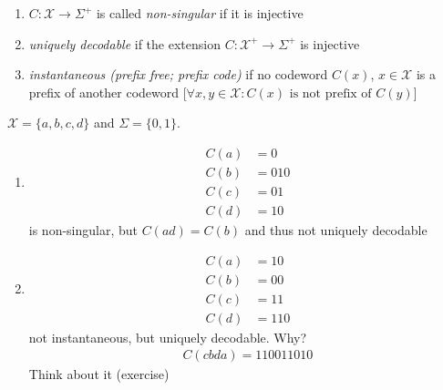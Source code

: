\documentclass[mfit.tex]{subfiles}
\begin{document}
\begin{defi*}
  \begin{enumerate}
    \item $C: \mathcal{X} \to \Sigma^+$ is called \emph{non-singular} if it is injective
    \item \emph{uniquely decodable} if the extension $C: \mathcal{X}^+ \to \Sigma^+$ is injective
    \item \emph{instantaneous (prefix free; prefix code)} if no codeword $C(x)$, $x \in \mathcal{X}$ is a prefix of another codeword [$\forall x,y \in \mathcal{X}: C(x) \text{ is not prefix of } C(y)$]
  \end{enumerate}
\end{defi*}

\begin{ex}
  $\mathcal{X} = \{a,b,c,d\}$ and $\Sigma = \{0,1\}$.
  \begin{enumerate}
    \item \begin{align*}
      C(a) &= 0 \\
      C(b) &= 010 \\
      C(c) &= 01 \\
      C(d) &= 10
    \end{align*}
    is non-singular, but $C(ad) = C(b)$ and thus not uniquely decodable
    \item \begin{align*}
      C(a) &= 10 \\
      C(b) &= 00 \\
      C(c) &= 11 \\
      C(d) &= 110
    \end{align*}
    not instantaneous, but uniquely decodable. Why?
    \begin{align*}
      C(cbda) = 110011010
    \end{align*}
    Think about it (exercise)
  \end{enumerate}
\end{ex}
\end{document}
